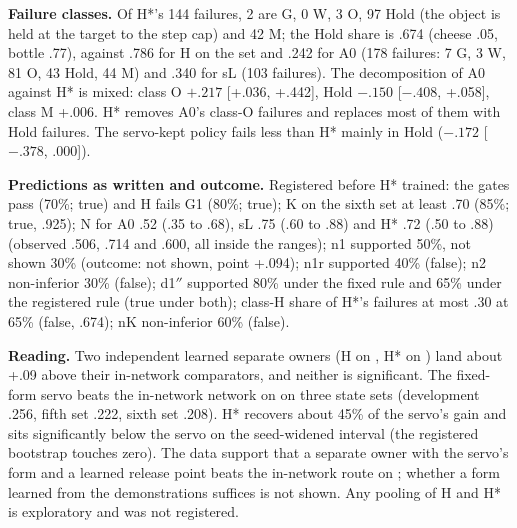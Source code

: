 \textbf{Failure classes.} Of H*'s 144 failures, 2 are G, 0 W, 3 O, 97 Hold (the object is held at the target to the step cap) and 42 M; the Hold share is .674 (cheese .05, bottle .77), against .786 for H on the \pifive{} set and .242 for A0 (178 failures: 7 G, 3 W, 81 O, 43 Hold, 44 M) and .340 for sL (103 failures). The decomposition of A0 against H* is mixed: class O $+.217$ [+.036, +.442], Hold $-.150$ [$-.408$, +.058], class M +.006. H* removes A0's class-O failures and replaces most of them with Hold failures. The servo-kept policy fails less than H* mainly in Hold ($-.172$ [$-.378$, .000]).

\textbf{Predictions as written and outcome.} Registered before H* trained: the gates pass (70\%; true) and H fails G1 (80\%; true); K on the sixth set at least .70 (85\%; true, .925); N for A0 .52 (.35 to .68), sL .75 (.60 to .88) and H* .72 (.50 to .88) (observed .506, .714 and .600, all inside the ranges); n1 supported 50\%, not shown 30\% (outcome: not shown, point +.094); n1r supported 40\% (false); n2 non-inferior 30\% (false); d1$''$ supported 80\% under the fixed rule and 65\% under the registered rule (true under both); class-H share of H*'s failures at most .30 at 65\% (false, .674); nK non-inferior 60\% (false).

\textbf{Reading.} Two independent learned separate owners (H on \pifive, H* on \pizero) land about +.09 above their in-network comparators, and neither is significant. The fixed-form servo beats the in-network network on \pizero{} on three state sets (development \mi.256, fifth set \mi.222, sixth set \mi.208). H* recovers about 45\% of the servo's gain and sits significantly below the servo on the seed-widened interval (the registered bootstrap touches zero). The data support that a separate owner with the servo's form and a learned release point beats the in-network route on \pizero{}; whether a form learned from the demonstrations suffices is not shown. Any pooling of H and H* is exploratory and was not registered.

